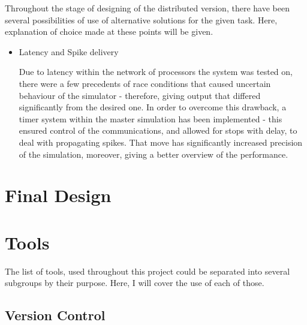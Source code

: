 Throughout the stage of designing of the distributed version, there have been several possibilities of use of alternative solutions for the given task. Here, explanation of choice made at these points will be given.

\begin{itemize}

\item {Latency and Spike delivery}

Due to latency within the network of processors the system was tested on, there were a few precedents of race conditions that caused uncertain behaviour of the simulator - therefore, giving output that differed significantly from the desired one. In order to overcome this drawback, a timer system within the master simulation has been implemented - this ensured control of the communications, and allowed for stops with delay, to deal with propagating spikes. That move has significantly increased precision of the simulation, moreover, giving a better overview of the performance.

\end{itemize}

\section{Final Design}


\section{Tools}

The list of tools, used throughout this project could be separated into several subgroups by their purpose. Here, I will cover the use of each of those.

\subsection{Version Control}
